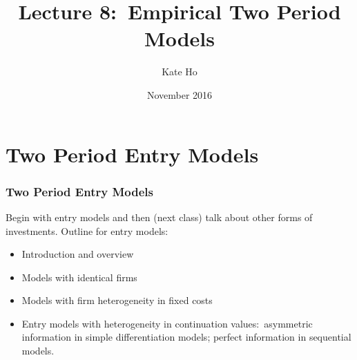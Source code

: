 \documentclass[notes=show]{beamer}
\begin{document}
\title[Lecture 10]{Lecture 8:\ Empirical Two Period Models}
\author{Kate Ho }
\date[11/13]{ November 2016}
\maketitle

\section{Two Period Entry Models}

\begin{frame}%
\frametitle{Two Period Entry Models}

Begin with entry models and then (next class) talk about other forms of
investments. Outline for entry models:

\begin{itemize}
\item Introduction and overview

\item Models with identical firms

\item Models with firm heterogeneity in fixed costs

\item Entry models with heterogeneity in continuation values:\ asymmetric
information in simple differentiation models; perfect information in
sequential models.
\end{itemize}

\end{frame}%
\end{document}
